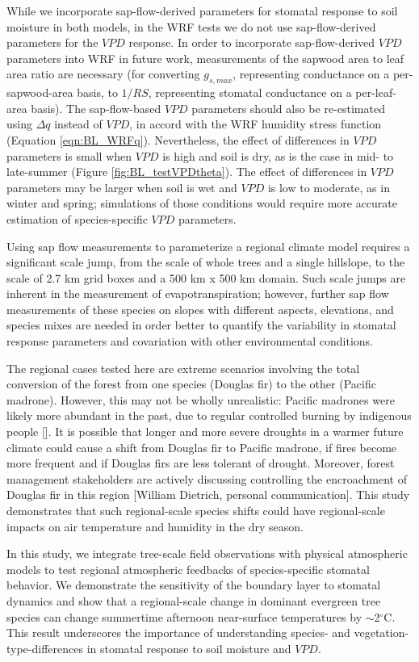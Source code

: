 While we incorporate sap-flow-derived parameters for stomatal response to soil moisture in both models, in the WRF tests we do not use sap-flow-derived parameters for the $VPD$ response.  In order to incorporate sap-flow-derived $VPD$ parameters into WRF in future work, measurements of the sapwood area to leaf area ratio are necessary (for converting $g_{s,max}$, representing conductance on a per-sapwood-area basis, to $1/RS$, representing stomatal conductance on a per-leaf-area basis).  The sap-flow-based $VPD$ parameters should also be re-estimated using $\Delta q$ instead of $VPD$, in accord with the WRF humidity stress function (Equation \ref{eqn:BL_WRFq}).  Nevertheless, the effect of differences in $VPD$ parameters is small when $VPD$ is high and soil is dry, as is the case in mid- to late-summer (Figure \ref{fig:BL_testVPDtheta}).  The effect of differences in $VPD$ parameters may be larger when soil is wet and $VPD$ is low to moderate, as in winter and spring; simulations of those conditions would require more accurate estimation of species-specific $VPD$ parameters.

Using sap flow measurements to parameterize a regional climate model requires a significant scale jump, from the scale of whole trees and a single hillslope, to the scale of 2.7 km grid boxes and a 500 km x 500 km domain.  Such scale jumps are inherent in the measurement of evapotranspiration; however, further sap flow measurements of these species on slopes with different aspects, elevations, and species mixes are needed in order better to quantify the variability in stomatal response parameters and covariation with other environmental conditions.

The regional cases tested here are extreme scenarios involving the total conversion of the forest from one species (Douglas fir) to the other (Pacific madrone).  However, this may not be wholly unrealistic: Pacific madrones were likely more abundant in the past, due to regular controlled burning by indigenous people [\cite{johnsonACRR}].  It is possible that longer and more severe droughts in a warmer future climate could cause a shift from Douglas fir to Pacific madrone, if fires become more frequent and if Douglas firs are less tolerant of drought.  Moreover, forest management stakeholders are actively discussing controlling the encroachment of Douglas fir in this region [William Dietrich, personal communication]. This study demonstrates that such regional-scale species shifts could have regional-scale impacts on air temperature and humidity in the dry season.

In this study, we integrate tree-scale field observations with physical atmospheric models to test regional atmospheric feedbacks of species-specific stomatal behavior.  We demonstrate the sensitivity of the boundary layer to stomatal dynamics and show that a regional-scale change in dominant evergreen tree species can change summertime afternoon near-surface temperatures by $\sim$2$^\circ$C.  This result underscores the importance of understanding species- and vegetation-type-differences in stomatal response to soil moisture and $VPD$.
